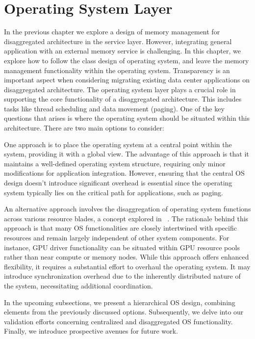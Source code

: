 \chapter{Operating System Layer}
\label{chap:os}
In the previous chapter we explore a design of memory management for disaggregated architecture in the service layer. However, integrating general application with an external memory service is challenging. In this chapter, we explore how to follow the class design of operating system, and leave the memory management functionality within the operating system. Transparency is an important aspect when considering migrating existing data center applications on disaggregated architecture.
The operating system layer plays a crucial role in supporting the core functionality of a disaggregated architecture. This includes tasks like thread scheduling and data movement (paging). One of the key questions that arises is where the operating system should be situated within this architecture. There are two main options to consider:

 One approach is to place the operating system at a central point within the system, providing it with a global view. The advantage of this approach is that it maintains a well-defined operating system structure, requiring only minor modifications for application integration. However, ensuring that the central OS design doesn't introduce significant overhead is essential since the operating system typically lies on the critical path for applications, such as paging.

 An alternative approach involves the disaggregation of operating system functions across various resource blades, a concept explored in ~\cite{legoos}. The rationale behind this approach is that many OS functionalities are closely intertwined with specific resources and remain largely independent of other system components. For instance, GPU driver functionality can be situated within GPU resource pools rather than near compute or memory nodes. While this approach offers enhanced flexibility, it requires a substantial effort to overhaul the operating system. It may introduce synchronization overhead due to the inherently distributed nature of the system, necessitating additional coordination.

In the upcoming subsections, we present a hierarchical OS design, combining elements from the previously discussed options. Subsequently, we delve into our validation efforts concerning centralized and disaggregated OS functionality. Finally, we introduce prospective avenues for future work.

